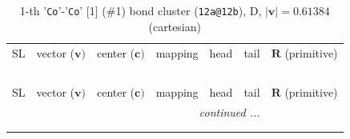 \documentclass[fleqn,10pt,landscape]{jsarticle}
\begin{document}
\renewcommand{\arraystretch}{1.6}
\begin{longtable}[l]{cllllll}
\captionsetup{justification=raggedright, singlelinecheck=off}
\caption{1-th '\texttt{Co}'-'\texttt{Co}' [1] (\#1) bond cluster (\texttt{12a@12b}), D, $|\bm{v}|=0.61384$ (cartesian)}
 \\
 \hline \hline
SL & vector ($\bm{v})$ & center ($\bm{c})$ & mapping & head & tail & $\bm{R}$ (primitive) \\ \hline \endfirsthead

\multicolumn{6}{l}{\tablename\ \thetable{}} \\
 \hline \hline
SL & vector ($\bm{v})$ & center ($\bm{c})$ & mapping & head & tail & $\bm{R}$ (primitive) \\ \hline \endhead

 \hline \hline
\multicolumn{6}{r}{\footnotesize\it continued ...} \\ \endfoot

 \hline \hline
\multicolumn{6}{r}{} \\ \endlastfoot


\end{longtable}
\end{document}
